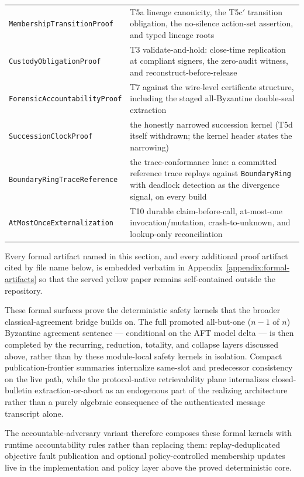 \documentclass[11pt]{article}
\newcommand{\code}[1]{\texttt{#1}}
\begin{document}
\begin{center}
\begin{tabularx}{\textwidth}{>{\raggedright\arraybackslash}p{} X}
\code{MembershipTransitionProof} & T5a lineage canonicity, the T5c\('\) transition obligation, the no-silence action-set assertion, and typed lineage roots \\
\code{CustodyObligationProof} & T3 validate-and-hold: close-time replication at compliant signers, the zero-audit witness, and reconstruct-before-release \\
\code{ForensicAccountabilityProof} & T7 against the wire-level certificate structure, including the staged all-Byzantine double-seal extraction \\
\code{SuccessionClockProof} & the honestly narrowed succession kernel (T5d itself withdrawn; the kernel header states the narrowing) \\
\code{BoundaryRingTraceReference} & the trace-conformance lane: a committed reference trace replays against \code{BoundaryRing} with deadlock detection as the divergence signal, on every build \\
\code{AtMostOnceExternalization} & T10 durable claim-before-call, at-most-one invocation/mutation, crash-to-unknown, and lookup-only reconciliation \\
\bottomrule
\end{tabularx}
\end{center}

Every formal artifact named in this section, and every additional proof
artifact cited by file name below, is embedded verbatim in
Appendix~\ref{appendix:formal-artifacts} so that the served yellow paper
remains self-contained outside the repository.

These formal surfaces prove the deterministic safety kernels that the broader
classical-agreement bridge builds on. The full promoted all-but-one
(\(n-1\) of \(n\)) Byzantine agreement sentence --- conditional on the AFT
model delta --- is then completed by the recurring,
reduction, totality, and collapse layers discussed above, rather than by these
module-local safety kernels in isolation. Compact publication-frontier
summaries internalize same-slot and predecessor consistency on the live path,
while the protocol-native retrievability plane internalizes closed-bulletin
extraction-or-abort as an endogenous part of the realizing architecture rather
than a purely algebraic consequence of the authenticated message transcript
alone.

The accountable-adversary variant therefore composes these formal kernels with
runtime accountability rules rather than replacing them: replay-deduplicated
objective fault publication and optional policy-controlled membership updates
live in the implementation and policy layer above the proved
deterministic core.
\end{document}
